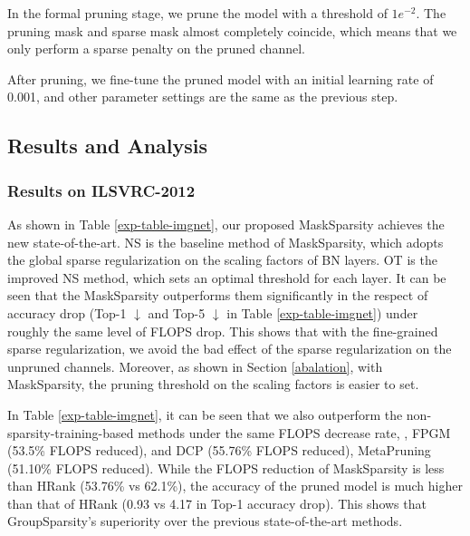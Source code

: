 \documentclass[review]{cvpr}
\begin{document}
In the formal pruning stage, we prune the model with a threshold of $1e^{-2}$. The pruning mask and sparse mask almost completely coincide,  which means that we only perform a sparse penalty on the pruned channel.

After pruning, we fine-tune the pruned model with an initial learning rate of 0.001, and
other parameter settings are the same as the previous step.



\subsection{Results and Analysis}

\subsubsection{Results on ILSVRC-2012}\label{results_on_ILSVRC-2012}
As shown in Table \ref{exp-table-imgnet}, our proposed MaskSparsity achieves the new state-of-the-art. NS \cite{liu2017learning} is the baseline method of MaskSparsity, which adopts the global sparse regularization on the scaling factors of BN layers. OT \cite{OT} is the improved NS method, which sets an optimal threshold for each layer. It can be seen that the MaskSparsity outperforms them significantly in the respect of accuracy drop (Top-1 $\downarrow$  and Top-5 $\downarrow$  in Table \ref{exp-table-imgnet}) under roughly the same level of FLOPS drop. This shows that with the fine-grained sparse regularization, we avoid the bad effect of the sparse regularization on the unpruned channels. Moreover, as shown in Section \ref{abalation}, with MaskSparsity, the pruning threshold on the scaling factors is easier to set.

In Table \ref{exp-table-imgnet}, it can be seen that we also outperform the non-sparsity-training-based methods under the same FLOPS decrease rate, \eg, FPGM \cite{FPGM} (53.5\% FLOPS reduced), and DCP \cite{zhuang2018discrimination} (55.76\% FLOPS reduced), MetaPruning \cite{Metapruning} (51.10\% FLOPS reduced). While the FLOPS reduction of MaskSparsity is less than HRank (53.76\% vs 62.1\%), the accuracy of the pruned model is much higher than that of HRank (0.93 vs 4.17 in Top-1 accuracy drop).
This shows that GroupSparsity's superiority over the previous state-of-the-art methods.
 
\end{document}
